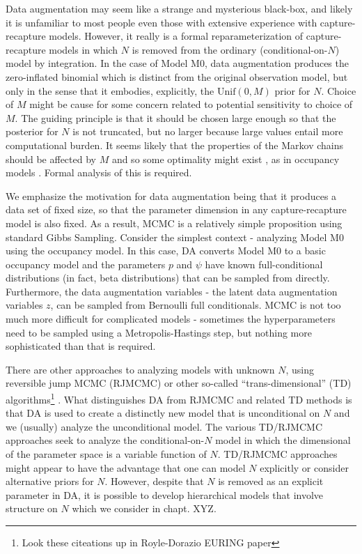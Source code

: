 Data augmentation may seem like a strange and mysterious black-box,
and likely it is unfamiliar to most people even those with extensive
experience with capture-recapture models. However, it really is a
formal reparameterization of capture-recapture models in which $N$ is
removed from the ordinary (conditional-on-$N$) model by integration.
In the case of Model M0, data augmentation produces the zero-inflated
binomial which is distinct from the original observation model, but
only in the sense that it embodies, explicitly, the $\mbox{Unif}(0,M)$
prior for $N$.  Choice of $M$ might be cause for some concern related
to potential sensitivity to choice of $M$. The guiding principle is
that it should be chosen large enough so that the posterior for $N$ is
not truncated, but no larger because large values entail more
computational burden. It seems likely that the properties of the
Markov chains should be affected by $M$ and so some optimality might
exist \citep{gopalaswamy_etal:2012}, as in occupancy models
\citep{mackenzie_royle:2005}. Formal analysis of this is required.


We emphasize the motivation for data augmentation being that it
produces a data set of fixed size, so that the parameter dimension in
any capture-recapture model is also fixed.  As a result, MCMC is a
relatively simple proposition using standard Gibbs Sampling.  Consider
the simplest context - analyzing Model M0 using the occupancy
model. In this case, DA converts Model M0 to a basic occupancy model
and the parameters $p$ and $\psi$ have known full-conditional
distributions (in fact, beta distributions) that can be sampled from
directly.  Furthermore, the data augmentation variables - the latent
data augmentation variables $z$, can be sampled from Bernoulli full
conditionals. MCMC is not too much more difficult for complicated
models - sometimes the hyperparameters need to be sampled using a
Metropolis-Hastings step, but nothing more sophisticated than that is
required.

There are other approaches to analyzing models with unknown $N$, using
reversible jump MCMC (RJMCMC) or other so-called ``trans-dimensional''
(TD) algorithms\footnote{Look these citeations up in Royle-Dorazio
  EURING paper} \citep{durbin_elston:2005, king_etal:XXXX,
  schofield_barker:XXXX}. What distinguishes DA from RJMCMC and
related TD methods is that DA is used to create a distinctly new model
that is unconditional on $N$ and we (usually) analyze the
unconditional model. The various TD/RJMCMC approaches seek to analyze
the conditional-on-$N$ model in which the dimensional of the parameter
space is a variable function of $N$. TD/RJMCMC approaches might appear
to have the advantage that one can model $N$ explicitly or consider
alternative priors for $N$. However, despite that $N$ is removed as an
explicit parameter in DA, it is possible to develop hierarchical
models that involve structure on $N$ \citep{converse_royle:2010,
  royle_etal:2011} which we consider in chapt.  XYZ.

